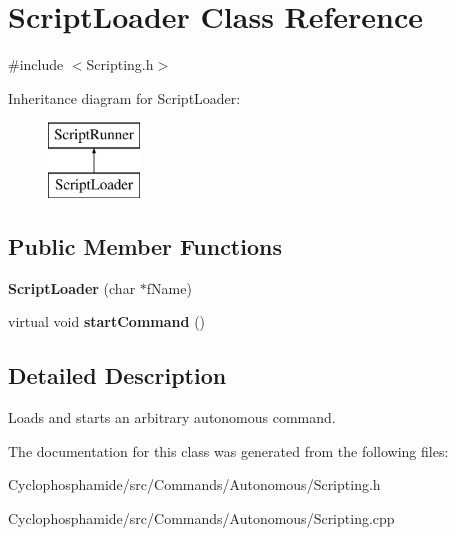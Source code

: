 \hypertarget{class_script_loader}{}\section{Script\+Loader Class Reference}
\label{class_script_loader}


{\ttfamily \#include $<$Scripting.\+h$>$}

Inheritance diagram for Script\+Loader\+:\begin{figure}[H]
\begin{center}
\leavevmode
\includegraphics[height=2.000000cm]{class_script_loader}
\end{center}
\end{figure}
\subsection*{Public Member Functions}
\begin{DoxyCompactItemize}
\item 
\hypertarget{class_script_loader_ac93edaa9f08c4db68656111f7a67ed33}{}{\bfseries Script\+Loader} (char $\ast$f\+Name)\label{class_script_loader_ac93edaa9f08c4db68656111f7a67ed33}

\item 
\hypertarget{class_script_loader_a26ce4039c88c15c1d781696634220ba5}{}virtual void {\bfseries start\+Command} ()\label{class_script_loader_a26ce4039c88c15c1d781696634220ba5}

\end{DoxyCompactItemize}


\subsection{Detailed Description}
Loads and starts an arbitrary autonomous command. 

The documentation for this class was generated from the following files\+:\begin{DoxyCompactItemize}
\item 
Cyclophosphamide/src/\+Commands/\+Autonomous/Scripting.\+h\item 
Cyclophosphamide/src/\+Commands/\+Autonomous/Scripting.\+cpp\end{DoxyCompactItemize}
